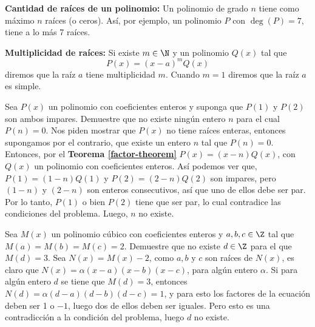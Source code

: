 {    \textbf{Cantidad de raíces de un polinomio:} Un polinomio de grado $n$ tiene como máximo $n$ raíces (o ceros). Así, por ejemplo, un polinomio $P$ con $\deg{(P)} = 7$, tiene a lo más 7 raíces.

    \textbf{Multiplicidad de raíces:} Si existe $m \in \N$ y un polinomio $Q(x)$ tal que \[P(x) = (x - a)^m Q(x)\] diremos que la raíz $a$ tiene multiplicidad $m$. Cuando $m = 1$ diremos que la raíz $a$ es simple.

    \begin{example}
        Sea $P(x)$ un polinomio con coeficientes enteros y suponga que $P(1)$ y $P(2)$ son ambos impares. Demuestre que no existe ningún entero $n$ para el cual $P(n) = 0$.
        \exampleProof
        {
            Nos piden mostrar que $P(x)$ no tiene raíces enteras, entonces supongamos por el contrario, que existe un entero $n$ tal que $P(n) = 0$. Entonces, por el \textbf{Teorema \ref{factor-theorem}} $P(x) = (x - n)Q(x)$, con $Q(x)$ un polinomio con coeficientes enteros. Así podemos ver que, $P(1) = (1 - n)Q(1)$ y $P(2) = (2 - n)Q(2)$ son impares, pero $(1 - n)$ y $(2 - n)$ son enteros consecutivos, así que uno de ellos debe ser par. Por lo tanto, $P(1)$ o bien $P(2)$ tiene que ser par, lo cual contradice las condiciones del problema. Luego, $n$ no existe.
        }
    \end{example}

    \begin{example}
        Sea $M(x)$ un polinomio cúbico con coeficientes enteros y $a, b, c \in \Z$ tal que $M(a) = M(b) = M(c) = 2$. Demuestre que no existe $d \in \Z$ para el que $M(d) = 3.$
        \exampleProof
        {
            Sea $N(x) = M(x) - 2$, como $a, b \mbox{ y } c$ son raíces de $N(x)$, es claro que $N(x) = \alpha (x - a)(x - b)(x - c)$, para algún entero $\alpha$. Si para algún entero $d$ se tiene que $M(d) = 3$, entonces $N(d) = \alpha (d - a)(d - b)(d - c) = 1$, y para esto los factores de la ecuación deben ser 1 o $-1$, luego dos de ellos deben ser iguales. Pero esto es una contradicción a la condición del problema, luego $d$ no existe.
        }
    \end{example}
}
\label{subsec:definiciones}

